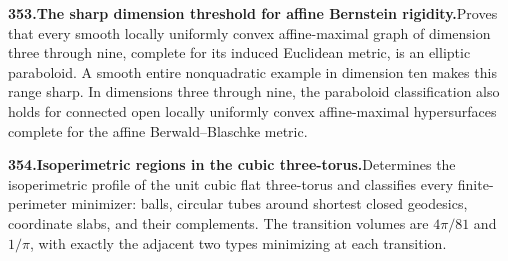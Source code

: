 \documentclass[11pt,a4paper]{article}
\begin{document}
  \par \begin{minipage}{\linewidth}
  \fontsize{10.5}{12.6}\selectfont\RaggedRight
  \hypertarget{result 353}{}
  {\bfseries\textcolor{muted}{353.}\enspace The sharp dimension threshold for affine Bernstein rigidity.}\enspace Proves that every smooth locally uniformly convex affine-maximal graph of dimension three through nine, complete for its induced Euclidean metric, is an elliptic paraboloid. A smooth entire nonquadratic example in dimension ten makes this range sharp. In dimensions three through nine, the paraboloid classification also holds for connected open locally uniformly convex affine-maximal hypersurfaces complete for the affine Berwald--Blaschke metric.\par
  \end{minipage}\par\vspace{5pt}



  \par \begin{minipage}{\linewidth}
  \fontsize{10.5}{12.6}\selectfont\RaggedRight
  \hypertarget{result 354}{}
  {\bfseries\textcolor{muted}{354.}\enspace Isoperimetric regions in the cubic three-torus.}\enspace Determines the isoperimetric profile of the unit cubic flat three-torus and classifies every finite-perimeter minimizer: balls, circular tubes around shortest closed geodesics, coordinate slabs, and their complements. The transition volumes are $4\pi/81$ and $1/\pi$, with exactly the adjacent two types minimizing at each transition.\par
  \end{minipage}\par\vspace{5pt}
\end{document}
